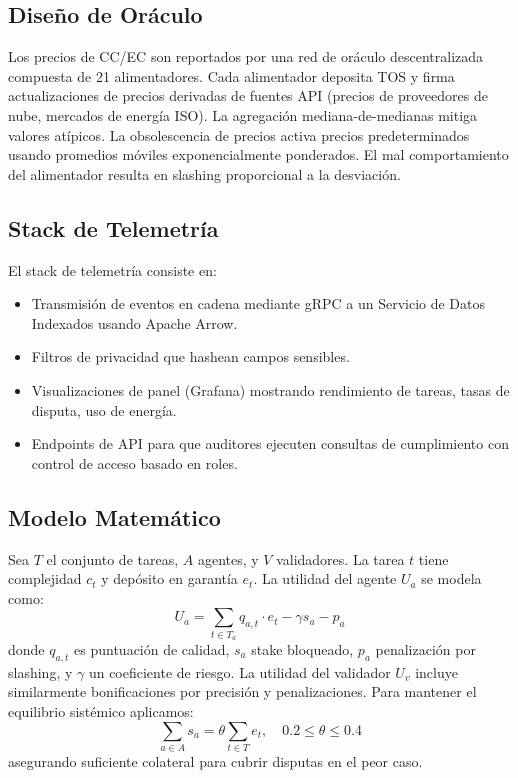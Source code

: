 \documentclass[11pt]{article}
\begin{document}
\subsection{Diseño de Oráculo}
Los precios de CC/EC son reportados por una red de oráculo descentralizada compuesta de 21 alimentadores. Cada alimentador deposita TOS y firma actualizaciones de precios derivadas de fuentes API (precios de proveedores de nube, mercados de energía ISO). La agregación mediana-de-medianas mitiga valores atípicos. La obsolescencia de precios activa precios predeterminados usando promedios móviles exponencialmente ponderados. El mal comportamiento del alimentador resulta en slashing proporcional a la desviación.

\subsection{Stack de Telemetría}
El stack de telemetría consiste en:
\begin{itemize}[noitemsep]
  \item Transmisión de eventos en cadena mediante gRPC a un Servicio de Datos Indexados usando Apache Arrow.
  \item Filtros de privacidad que hashean campos sensibles.
  \item Visualizaciones de panel (Grafana) mostrando rendimiento de tareas, tasas de disputa, uso de energía.
  \item Endpoints de API para que auditores ejecuten consultas de cumplimiento con control de acceso basado en roles.
\end{itemize}

\subsection{Modelo Matemático}
Sea $T$ el conjunto de tareas, $A$ agentes, y $V$ validadores. La tarea $t$ tiene complejidad $c_t$ y depósito en garantía $e_t$. La utilidad del agente $U_a$ se modela como:
\begin{equation}
U_a = \sum_{t \in T_a} q_{a,t}\cdot e_t - \gamma s_a - p_a\label{eq:agent-utility}
\end{equation}
donde $q_{a,t}$ es puntuación de calidad, $s_a$ stake bloqueado, $p_a$ penalización por slashing, y $\gamma$ un coeficiente de riesgo. La utilidad del validador $U_v$ incluye similarmente bonificaciones por precisión y penalizaciones. Para mantener el equilibrio sistémico aplicamos:
\begin{equation}
\sum_{a \in A} s_a = \theta \sum_{t \in T} e_t,\quad 0.2 \leq \theta \leq 0.4
\end{equation}
asegurando suficiente colateral para cubrir disputas en el peor caso.
\end{document}
